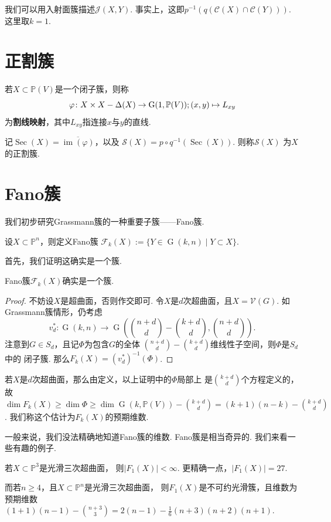     我们可以用入射面簇描述$\mathcal{J}(X,Y)$. 
    事实上，这即$p^{-1}(q(\mathscr{C}(X)\cap\mathscr{C}(Y)))$. 这里取$k=1$.

\section{正割簇}
    若$X \subset \mathbb{P}(V)$是一个闭子簇，则称
    \[\varphi\colon X \times X - \Delta(X) \rightarrow {\rm G}(1,\mathbb{P}(V));(x,y) \mapsto L_{xy}\]
    为\textbf{割线映射}，其中$L_{xy}$指连接$x$与$y$的直线. \par
    记$\operatorname{Sec}(X) = \overline{\operatorname{im}(\varphi)}$，以及
    $\mathcal{S}(X)=p \circ q^{-1}(\operatorname{Sec}(X))$. 则称$\mathcal{S}(X)$
    为$X$的正割簇.


\section{Fano簇}
    我们初步研究Grassmann簇的一种重要子簇——Fano簇.
    \begin{definition}[Fano簇]
        设$X \subset \mathbb{P}^{n}$，则定义Fano簇
        $\mathcal{F}_{k}(X):=\{Y \in \operatorname{G}(k,n)\mid Y \subset X\}$.
    \end{definition}
    首先，我们证明这确实是一个簇.

    \begin{proposition}
        Fano簇$\mathcal{F}_{k}(X)$确实是一个簇.
    \end{proposition}
    \begin{proof}
        不妨设$X$是超曲面，否则作交即可. 令$X$是$d$次超曲面，且$X = \mathcal{V}(G)$.
        如Grassmann簇情形，仍考虑
        \[v_{d}^{*}\colon\operatorname{G}(k,n) \rightarrow 
        \operatorname{G}({n+d \choose d}-{k+d \choose d},{n+d \choose d}).\]
        注意到$G \in S_{d}$，且记$\Phi$为包含$G$的全体
        ${n+d \choose d}-{k+d \choose d}$维线性子空间，则$\Phi$是$S_{d}$中的
        闭子簇. 那么$F_{k}(X) = (v_{d}^{*})^{-1}(\Phi)$.
    \end{proof}

    若$X$是$d$次超曲面，那么由定义，以上证明中的$\Phi$局部上
    是${k+d \choose d}$个方程定义的，
    故$\dim F_{k}(X) \geq \dim \Phi \geq \dim \operatorname{G}(k,\mathbb{P}(V))
    -{k+d \choose d} = (k+1)(n-k) - {k+d \choose d}$. 
    我们称这个估计为$F_{k}(X)$的预期维数.

    一般来说，我们没法精确地知道Fano簇的维数. Fano簇是相当奇异的. 我们来看一些有趣的例子.
    \begin{example}
        若$X \subset \mathbb{P}^{3}$是光滑三次超曲面，
        则$|F_{1}(X)| < \infty$. 更精确一点，$|F_{1}(X)|=27$.

        而若$n \geq 4$，且$X \subset \mathbb{P}^{n}$是光滑三次超曲面，
        则$F_{1}(X)$是不可约光滑簇，且维数为预期维数$(1+1)(n-1)-{n+3 \choose 3}=
        2(n-1)-\frac{1}{6}(n+3)(n+2)(n+1)$.
    \end{example}

